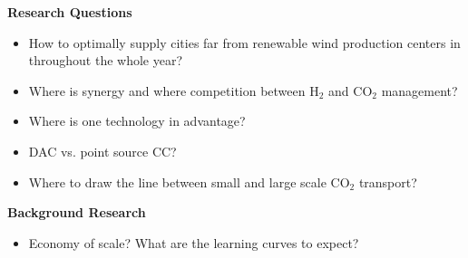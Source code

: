 \textbf{Research Questions}

\begin{itemize}
    \item How to optimally supply cities far from renewable wind production centers in throughout the whole year?    
    \item Where is synergy and where competition between H$_2$ and CO$_2$ management?
    \item Where is one technology in advantage?
    \item DAC vs. point source CC?
    \item Where to draw the line between small and large scale CO$_2$ transport?
\end{itemize}


\textbf{Background Research}

\begin{itemize}
    \item Economy of scale? What are the learning curves to expect?
\end{itemize}

